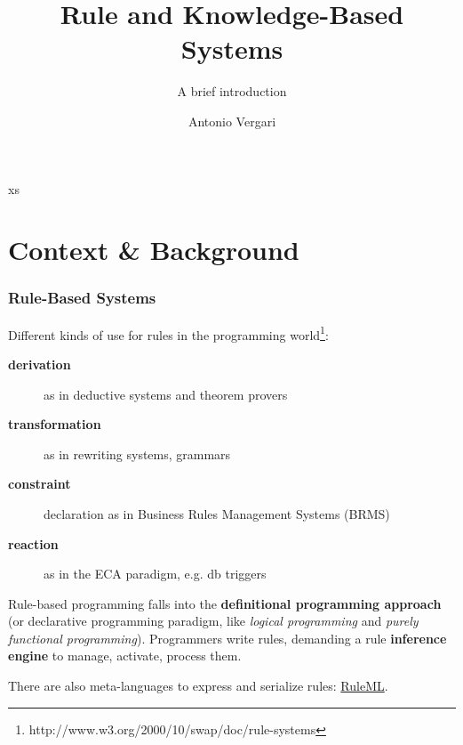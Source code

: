 \documentclass[xcolor={usenames,dvipsnames,svgnames}, compress]{beamer}
\begin{document}
\title{Rule and Knowledge-Based Systems}
\subtitle{A brief introduction}
\author{Antonio Vergari}


\footnotesize \let\small\footnotesize





{
  \begin{frame}
    \titlepage
  \end{frame}
}


xs\section{Context \& Background}
{
  \begin{frame}
    \sectionpage
  \end{frame}
}

\begin{frame}
  \frametitle{Rule-Based Systems}
  
  Different kinds of use for rules in the programming world\footnote{http://www.w3.org/2000/10/swap/doc/rule-systems}:
  \begin{description}
  \item[\textbf{derivation}] as in deductive systems and theorem provers
  \item[\textbf{transformation}] as in rewriting systems, grammars
  \item[\textbf{constraint}] declaration as in Business Rules Management Systems (BRMS)
  \item[\textbf{reaction}] as in the \textsf{ECA} paradigm, e.g. db triggers
  \end{description}\bigskip
  
  
  Rule-based programming falls into the \textbf{definitional programming
    approach} (or declarative programming paradigm, like \emph{logical programming} and
  \emph{purely functional programming}). Programmers write rules,
  demanding a rule \textbf{inference engine} to manage, activate,
  process them.\par\bigskip
  
  There are also meta-languages to express and serialize rules: \href{http://wiki.ruleml.org/index.php/RuleML_Home}{\textsf{RuleML}}.
\end{frame}
\end{document}
